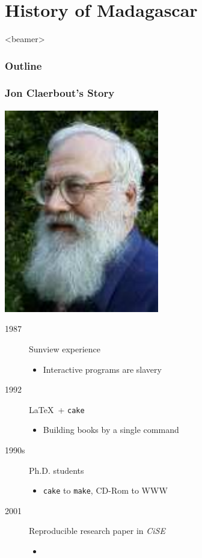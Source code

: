 \section{History of Madagascar}

\begin{frame}<beamer>
  \MadLogo
  \frametitle{Outline}
  \tableofcontents[currentsection]
\end{frame}

\begin{frame}
  \MadLogo
  \frametitle{Jon Claerbout's Story}

  {\flushright
  \includegraphics[height=0.2\textheight]{Fig/Claerbout}
  } 

  \begin{description}
  \item[1987] Sunview experience
  \begin{itemize}
  \item	Interactive programs are slavery
  \end{itemize}
  \item[1992] \LaTeX\ + \texttt{cake}
  \begin{itemize}
  \item Building books by a single command
  \end{itemize}
  \item[1990s] Ph.D. students
  \begin{itemize}
  \item \texttt{cake} to \texttt{make}, CD-Rom to WWW
  \end{itemize}
  \item[2001] Reproducible research paper in \emph{CiSE}
  \begin{itemize}
  \item {\color{blue}{The principal beneficiary is the author}}
  \end{itemize}
  \end{description}
\end{frame}

